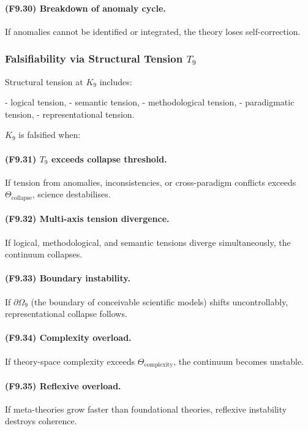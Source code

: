 \paragraph{(F9.30) Breakdown of anomaly cycle.}
If anomalies cannot be identified or integrated,
the theory loses self-correction.



\subsubsection{Falsifiability via Structural Tension \texorpdfstring{$T_9$}{T_9}}

Structural tension at $K_9$ includes:

- logical tension,
- semantic tension,
- methodological tension,
- paradigmatic tension,
- representational tension.

$K_9$ is falsified when:

\paragraph{(F9.31) \texorpdfstring{$T_9$}{T_9} exceeds collapse threshold.}
If tension from anomalies, inconsistencies, or cross-paradigm conflicts
exceeds $\Theta_{\mathrm{collapse}}$, 
science destabilises.

\paragraph{(F9.32) Multi-axis tension divergence.}
If logical, methodological, and semantic tensions diverge simultaneously,
the continuum collapses.

\paragraph{(F9.33) Boundary instability.}
If $\partial\Omega_9$ (the boundary of conceivable scientific models)
shifts uncontrollably, representational collapse follows.

\paragraph{(F9.34) Complexity overload.}
If theory-space complexity exceeds
$\Theta_{\mathrm{complexity}}$,
the continuum becomes unstable.

\paragraph{(F9.35) Reflexive overload.}
If meta-theories grow faster than foundational theories,
reflexive instability destroys coherence.



